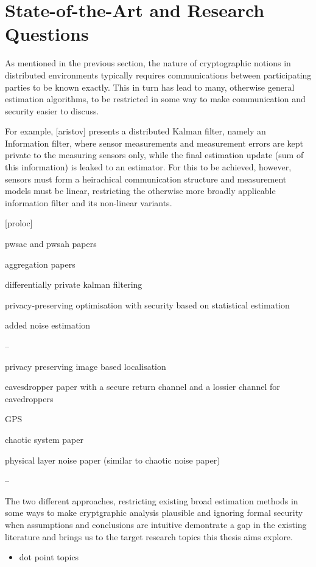 \section{State-of-the-Art and Research Questions}

As mentioned in the previous section, the nature of cryptographic notions in distributed environments typically requires communications between participating parties to be known exactly. This in turn has lead to many, otherwise general estimation algorithms, to be restricted in some way to make communication and security easier to discuss.

For example, [aristov] presents a distributed Kalman filter, namely an Information filter, where sensor measurements and measurement errors are kept private to the measuring sensors only, while the final estimation update (sum of this information) is leaked to an estimator. For this to be achieved, however, sensors must form a heirachical communication structure and measurement models must be linear, restricting the otherwise more broadly applicable information filter and its non-linear variants.

[proloc]

pwsac and pwsah papers

aggregation papers

differentially private kalman filtering

privacy-preserving optimisation with security based on statistical estimation

added noise estimation

--

privacy preserving image based localisation

eavesdropper paper with a secure return channel and a lossier channel for eavedroppers

GPS

chaotic system paper

physical layer noise paper (similar to chaotic noise paper)

--


The two different approaches, restricting existing broad estimation methods in some ways to make cryptgraphic analysis plausible and ignoring formal security when assumptions and conclusions are intuitive demontrate a gap in the existing literature and brings us to the target research topics this thesis aims explore.

\begin{itemize}
    \item dot point topics
\end{itemize}

